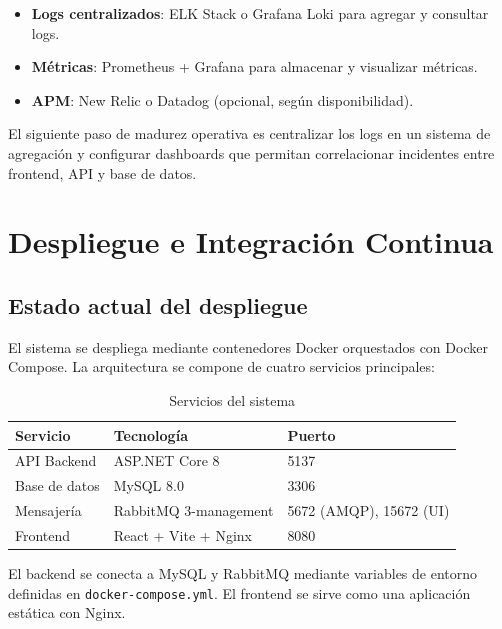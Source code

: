 \documentclass[12pt,letterpaper]{article}
\begin{document}
\begin{itemize}
    \item \textbf{Logs centralizados}: ELK Stack o Grafana Loki para agregar y consultar logs.
    \item \textbf{Métricas}: Prometheus + Grafana para almacenar y visualizar métricas.
    \item \textbf{APM}: New Relic o Datadog (opcional, según disponibilidad).
\end{itemize}

El siguiente paso de madurez operativa es centralizar los logs en un sistema de agregación y configurar dashboards que permitan correlacionar incidentes entre frontend, API y base de datos.













\section{Despliegue e Integración Continua}

\subsection{Estado actual del despliegue}

El sistema se despliega mediante contenedores Docker orquestados con Docker Compose. La arquitectura se compone de cuatro servicios principales:

\begin{table}[H]
\centering
\caption{Servicios del sistema}
\label{tab:servicios-despliegue}
\begin{tabular}{|l|l|l|}
\hline
\textbf{Servicio} & \textbf{Tecnología} & \textbf{Puerto} \\ \hline
API Backend & ASP.NET Core 8 & 5137 \\ \hline
Base de datos & MySQL 8.0 & 3306 \\ \hline
Mensajería & RabbitMQ 3-management & 5672 (AMQP), 15672 (UI) \\ \hline
Frontend & React + Vite + Nginx & 8080 \\ \hline
\end{tabular}
\end{table}

El backend se conecta a MySQL y RabbitMQ mediante variables de entorno definidas en \texttt{docker-compose.yml}. El frontend se sirve como una aplicación estática con Nginx.
\end{document}
